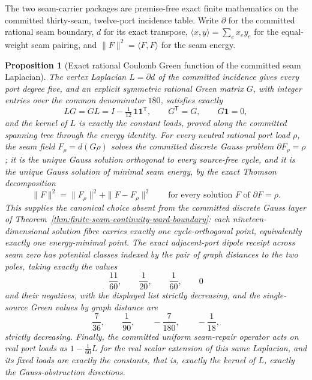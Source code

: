 \documentclass[11pt]{article}
\newtheorem{proposition}[theorem]{Proposition}
\theoremstyle{remark}
\theoremstyle{plain}
\begin{document}
The two seam-carrier packages are premise-free exact finite mathematics
on the committed thirty-seam, twelve-port incidence table. Write
\(\partial\) for the committed rational seam boundary, \(d\) for its
exact transpose, \(\langle x,y\rangle=\sum_ex_ey_e\) for the
equal-weight seam pairing, and \(\|F\|^2=\langle F,F\rangle\) for the
seam energy.

\begin{proposition}[Exact rational Coulomb Green function of the committed seam Laplacian]
\label{prop:discrete-coulomb-green}
The vertex Laplacian \(L=\partial d\) of the committed incidence gives
every port degree five, and an explicit symmetric rational Green matrix
\(G\), with integer entries over the common denominator \(180\),
satisfies exactly
\[
LG=GL=I-\tfrac1{12}\,\mathbf 1\mathbf 1^{\mathsf T},
\qquad
G^{\mathsf T}=G,\qquad G\mathbf 1=0,
\]
and the kernel of \(L\) is exactly the constant loads, proved along the
committed spanning tree through the energy identity. For every neutral
rational port load \(\rho\), the seam field \(F_\rho=d(G\rho)\) solves
the committed discrete Gauss problem \(\partial F_\rho=\rho\); it is
the unique Gauss solution orthogonal to every source-free cycle, and it
is the unique Gauss solution of minimal seam energy, by the exact
Thomson decomposition
\[
\|F\|^2=\|F_\rho\|^2+\|F-F_\rho\|^2
\qquad\text{for every solution }F\text{ of }\partial F=\rho .
\]
This supplies the canonical choice absent from the committed discrete Gauss
layer of Theorem~\ref{thm:finite-seam-continuity-ward-boundary}: each
nineteen-dimensional solution fibre carries exactly one
cycle-orthogonal point, equivalently exactly one energy-minimal point.
The exact adjacent-port dipole receipt across seam zero has potential
classes indexed by the pair of graph distances to the two poles, taking
exactly the values
\[
\frac{11}{60},\qquad\frac1{20},\qquad\frac1{60},\qquad 0
\]
and their negatives, with the displayed list strictly decreasing, and
the single-source Green values by graph distance are
\[
\frac7{36},\qquad\frac1{90},\qquad-\frac7{180},\qquad-\frac1{18},
\]
strictly decreasing. Finally, the committed uniform seam-repair
operator acts on real port loads as \(1-\tfrac1{60}L\) for the real
scalar extension of this same Laplacian, and its fixed loads are
exactly the constants, that is, exactly the kernel of \(L\), exactly
the Gauss-obstruction directions.
\end{proposition}
\end{document}

